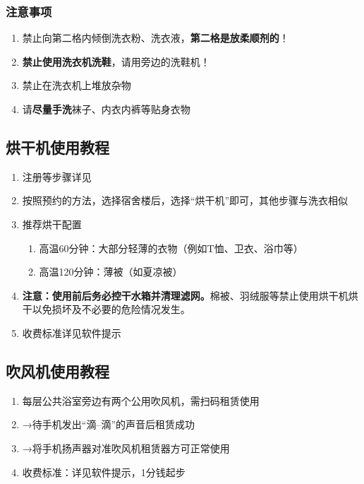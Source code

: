 \subsubsection[注意事项]{注意事项}
\begin{enumerate}
    \item 禁止向第二格内倾倒洗衣粉、洗衣液，\textbf{第二格是放柔顺剂的}！
    \item \textbf{禁止使用洗衣机洗鞋}，请用旁边的洗鞋机！
    \item 禁止在洗衣机上堆放杂物
    \item 请\textbf{尽量手洗}袜子、内衣内裤等贴身衣物
\end{enumerate}

\subsection[烘干机使用教程]{烘干机使用教程}
\label{dry_machine}
\begin{enumerate}
    \item 注册等步骤详见
    \item 按照预约的方法，选择宿舍楼后，选择“烘干机”即可，其他步骤与洗衣相似
    \item 推荐烘干配置
          \begin{enumerate}
              \item 高温60分钟：大部分轻薄的衣物（例如T恤、卫衣、浴巾等）
              \item 高温120分钟：薄被（如夏凉被）
          \end{enumerate}
    \item \textbf{注意：}\textbf{使用前后务必控干水箱并清理滤网。}棉被、羽绒服等禁止使用烘干机烘干以免损坏及不必要的危险情况发生。
    \item 收费标准详见软件提示
\end{enumerate}

\subsection[吹风机使用教程]{吹风机使用教程}
\label{hair_drier}
\begin{enumerate}
    \item 每层公共浴室旁边有两个公用吹风机，需扫码\footnotemark 租赁使用
    \item →待手机发出“滴--滴”的声音后租赁成功
    \item →将手机扬声器对准吹风机租赁器方可正常使用
    \item 收费标准：详见软件提示，1分钱起步
\end{enumerate}

